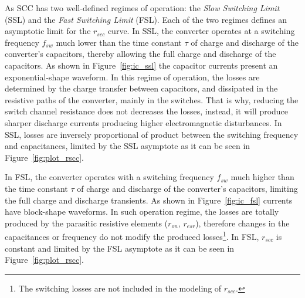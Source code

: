 As SCC has two well-defined regimes of operation: the \emph{Slow Switching Limit} (SSL) and the \emph{Fast Switching Limit} (FSL). Each of the two regimes defines an asymptotic limit for the $r_{scc}$ curve. In SSL, the converter operates at a switching frequency $f_{sw}$ much lower than the time constant $\tau$ of charge and discharge of the converter's capacitors, thereby allowing the full charge and discharge of the capacitors. As shown in Figure~\ref{fig:ic_ssl} the capacitor currents present an exponential-shape waveform. In this regime of operation, the losses are determined by the charge transfer between capacitors, and dissipated in the resistive paths of the converter, mainly in the switches. That is why, reducing the switch channel resistance does not decreases the losses, instead, it will produce sharper discharge currents producing higher electromagnetic disturbances. In SSL, losses are inversely proportional of product between the switching frequency and capacitances, limited by the SSL asymptote as it can be seen in Figure~\ref{fig:plot_rscc}.

In FSL, the converter operates with a switching frequency $f_{sw}$ much higher than the time constant $\tau$ of charge and discharge of the converter's capacitors, limiting the full charge and discharge transients. As shown in Figure~\ref{fig:ic_fsl} currents have block-shape waveforms. In such operation regime, the losses are totally produced by the parasitic resistive elements ($r_{on}$, $r_{esr}$), therefore changes in the capacitances or frequency do not modify the produced losses\footnote{The switching losses are not included in the modeling of $r_{scc}$. }. In FSL, $r_{scc}$ is constant and limited by the FSL asymptote as it can be seen in Figure~\ref{fig:plot_rscc}.

